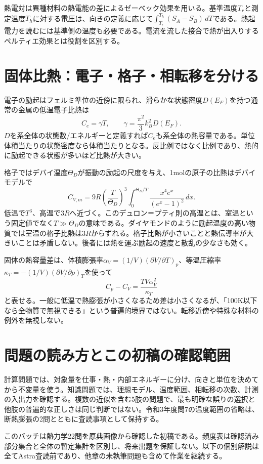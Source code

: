 熱電対は異種材料の熱電能の差によるゼーベック効果を用いる。基準温度$T_r$と測定温度$T_h$に対する電圧は、向きの定義に応じて$\int_{T_r}^{T_h}(S_A-S_B)\,dT$である。熱起電力を読むには基準側の温度も必要である。電流を流した接合で熱が出入りするペルティエ効果とは役割を区別する。

\section{固体比熱：電子・格子・相転移を分ける}
\label{theory:thermo:solidcapacity}
電子の励起はフェルミ準位の近傍に限られ、滑らかな状態密度$D(E_F)$を持つ通常の金属の低温電子比熱は
\[
 C_e=\gamma T,\qquad\gamma=\frac{\pi^2}{3}k_B^2D(E_F).
\]
$D$を系全体の状態数/エネルギーと定義すれば$C_e$も系全体の熱容量である。単位体積当たりの状態密度なら体積当たりとなる。反比例ではなく比例であり、熱的に励起できる状態が多いほど比熱が大きい\parencite{mit_electronic_heat2012}。

格子ではデバイ温度$\Theta_D$が振動の励起の尺度を与え、1molの原子の比熱はデバイモデルで
\[
 C_{V,m}=9R\left(\frac{T}{\Theta_D}\right)^3
 \int_0^{\Theta_D/T}\frac{x^4 e^x}{(e^x-1)^2}\,dx.
\]
低温で$T^3$、高温で$3R$へ近づく。このデュロン＝プティ則の高温とは、室温という固定値でなく$T\gg\Theta_D$の意味である\parencite{mit_debye2005}。ダイヤモンドのように励起温度の高い物質では室温の格子比熱は$3R$からずれる。格子比熱が小さいことと熱伝導率が大きいことは矛盾しない。後者には熱を運ぶ励起の速度と散乱の少なさも効く。

固体の熱容量差は、体積膨張率$\alpha_V=(1/V)(\partial V/\partial T)_p$、等温圧縮率$\kappa_T=-(1/V)(\partial V/\partial p)_T$を使って
\[
 C_p-C_V=\frac{TV\alpha_V^2}{\kappa_T}
\]
と表せる。一般に低温で熱膨張が小さくなるため差は小さくなるが、「100K以下なら全物質で無視できる」という普遍的境界ではない。転移近傍や特殊な材料の例外を無視しない。

\section{問題の読み方とこの初稿の確認範囲}
計算問題では、対象量を仕事・熱・内部エネルギーに分け、向きと単位を決めてから不変量を使う。知識問題では、理想モデル、温度範囲、相転移の次数、計測の入出力を確認する。複数の近似を含む5肢の問題で、最も明確な誤りの選択と他肢の普遍的な正しさは同じ判断ではない。令和3年度問7の温度範囲の省略は、断熱膨張の2問とともに査読事項として保持する。

このバッチは熱力学22問を原典画像から確認した初稿である。頻度表は確認済み部分集合と全体の暫定集計を区別し、将来出題を保証しない。以下の個別解説は全てAstra査読前であり、他章の未執筆問題も含めて作業を継続する。

